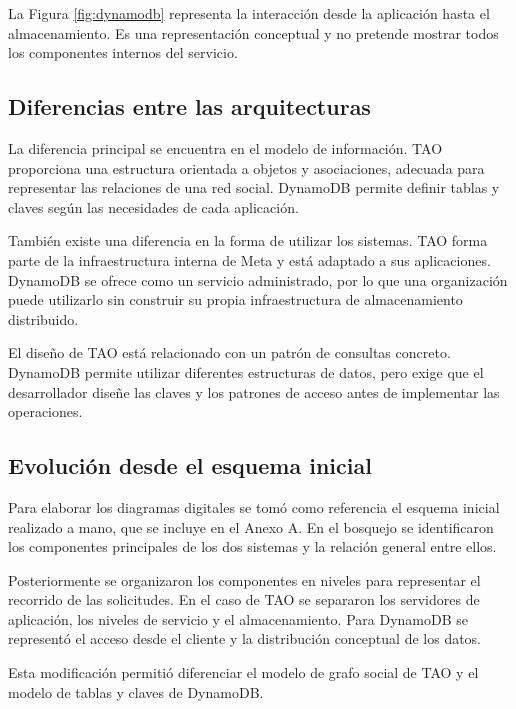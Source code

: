 \documentclass[12pt,a4paper]{article}
\begin{document}
La Figura \ref{fig:dynamodb} representa la interacción desde la aplicación hasta el almacenamiento. Es una representación conceptual y no pretende mostrar todos los componentes internos del servicio.

\subsection{Diferencias entre las arquitecturas}

La diferencia principal se encuentra en el modelo de información. TAO proporciona una estructura orientada a objetos y asociaciones, adecuada para representar las relaciones de una red social. DynamoDB permite definir tablas y claves según las necesidades de cada aplicación.

También existe una diferencia en la forma de utilizar los sistemas. TAO forma parte de la infraestructura interna de Meta y está adaptado a sus aplicaciones. DynamoDB se ofrece como un servicio administrado, por lo que una organización puede utilizarlo sin construir su propia infraestructura de almacenamiento distribuido.

El diseño de TAO está relacionado con un patrón de consultas concreto. DynamoDB permite utilizar diferentes estructuras de datos, pero exige que el desarrollador diseñe las claves y los patrones de acceso antes de implementar las operaciones.

\subsection{Evolución desde el esquema inicial}

Para elaborar los diagramas digitales se tomó como referencia el esquema inicial realizado a mano, que se incluye en el Anexo A. En el bosquejo se identificaron los componentes principales de los dos sistemas y la relación general entre ellos.

Posteriormente se organizaron los componentes en niveles para representar el recorrido de las solicitudes. En el caso de TAO se separaron los servidores de aplicación, los niveles de servicio y el almacenamiento. Para DynamoDB se representó el acceso desde el cliente y la distribución conceptual de los datos.

Esta modificación permitió diferenciar el modelo de grafo social de TAO y el modelo de tablas y claves de DynamoDB.

\end{document}
